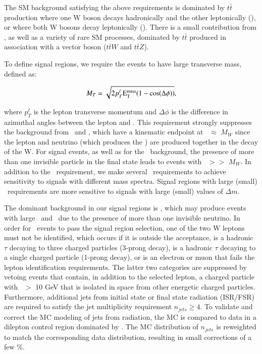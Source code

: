 The SM background satisfying the above requirements is dominated by $t\bar{t}$ production where
one W boson decays hadronically and the other leptonically (\ttljets), or where both W bosons decay leptonically (\ttll).
There is a small contribution from \wjets, as well as a variety of rare SM
processes, dominated by $t\bar{t}$ produced in association with a vector boson
($t\bar{t}W$ and $t\bar{t}Z$).

To define signal regions, we require the events to have large transverse mass, defined as:

\begin{equation}
M_T = \sqrt{ 2 p_{T}^{\ell} \rm{E_{T}^{miss}} ( 1-cos(\Delta\phi))},
\end{equation}

where $p_{T}^{\ell}$ is the lepton transverse momentum and $\Delta\phi$ is the difference in azimuthal angles between the lepton
and \met. This requirement strongly suppresses the background from \ttljets\ and \wjets, which have a kinematic endpoint
at \mt\ $\approx$ $M_W$ since the lepton and neutrino (which produces the \met) are produced together in the decay of the W.
For signal events, as well as for the \ttll\ background, the presence of more than one invisible
particle in the final state leads to events with \mt\ $>>$ $M_W$. 
In addition to the \mt\ requirement, we make several 
\met\ requirements to achieve sensitivity to signals with different mass spectra.
Signal regions with large (small) \met\ requirements are more sensitive to signals with large (small) values of $\Delta m$.

The dominant background in our signal regions is \ttll, which may produce events with large \met\ and \mt\ due to the presence of
more than one invisible neutrino. In order for \ttll\ events to pass the signal region selection, one of the two W leptons must not be identified,
which occurs if it is outside the acceptance, is a hadronic $\tau$ decaying to three charged particles (3-prong decay),
is a hadronic $\tau$ decaying to a single charged particle (1-prong decay), or is an electron or muon that fails the lepton identification
requirements. The latter two categories are suppressed by vetoing events that contain, in addition to the selected lepton, 
a charged particle with \pt\ $>$ 10 GeV that is isolated in space from other energetic charged particles. Furthermore, additional jets 
from initial state or final state radiation (ISR/FSR) are required to satisfy the jet multiplicity requirement $n_{jets}\geq4$. 
To validate and correct the MC modeling of jets from radiation, the MC is compared to data in a dilepton control region dominated by \ttll. 
The MC distribution of $n_{jets}$ is reweighted to match the corresponding data distribution, resulting in small corrections of a few \%.

